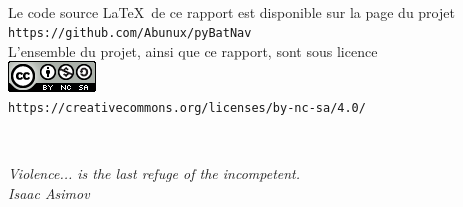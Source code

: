 \newpage
\ \\
\vfill

\begin{center}
Le code source \LaTeX\ de ce rapport est disponible sur la page du projet\\ \medskip
\texttt{https://github.com/Abunux/pyBatNav}\\ 
\vfill
L'ensemble du projet, ainsi que ce rapport, sont sous licence\\ \medskip
\includegraphics[scale=1]{./media/CC-Logo.png}\\
\texttt{https://creativecommons.org/licenses/by-nc-sa/4.0/}
\end{center}

\newpage
\ \\
\vspace{3cm}
\begin{flushright}


\textit{Violence... is the last refuge of the incompetent.\\
\medskip
Isaac Asimov
}

\end{flushright}
\vfill

\clearpage{\pagestyle{empty}\cleardoublepage}
\setcounter{tocdepth}{1}
\tableofcontents